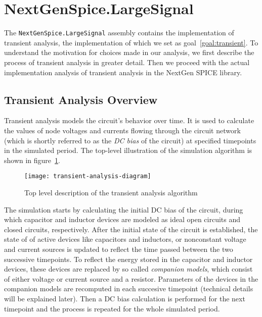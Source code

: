 \section{NextGenSpice.LargeSignal}

The \texttt{NextGenSpice.LargeSignal} assembly contains the implementation of transient analysis, the implementation of which we set as goal~\ref{goal:transient}. To understand the motivation for choices made in our analysis, we first describe the process of transient analysis in greater detail. Then we proceed with the actual implementation analysis of transient analysis in the NextGen SPICE library.

\subsection{Transient Analysis Overview}
\label{chap:analysis:transient-overview}
Transient analysis models the circuit's behavior over time. It is used to calculate the values of node voltages and currents flowing through the circuit network (which is shortly referred to as the \textit{DC bias} of the circuit) at specified timepoints in the simulated period. The top-level illustration of the simulation algorithm is shown in figure~\ref{fig:analysis-transient-top-level}.

\begin{figure}[h]
	\centering	
	\texttt{[image: transient-analysis-diagram]}
	\caption{Top level description of the transient analysis algorithm}
	\label{fig:analysis-transient-top-level}
\end{figure}

The simulation starts by calculating the initial DC bias of the circuit, during which capacitor and inductor devices are modeled as ideal open circuits and closed circuits, respectively. After the initial state of the circuit is established, the state of of active devices like capacitors and inductors, or nonconstant voltage and current sources is updated to reflect the time passed between the two successive timepoints. To reflect the energy stored in the capacitor and inductor devices, these devices are replaced by so called \textit{companion models}, which consist of either voltage or current source and a resistor. Parameters of the devices in the companion models are recomputed in each succesive timepoint (technical details will be explained later). Then a DC bias calculation is performed for the next timepoint and the process is repeated for the whole simulated period.

